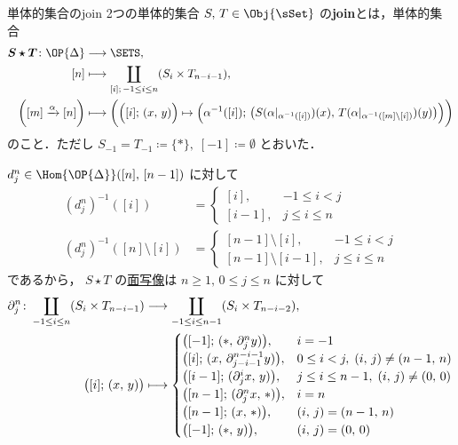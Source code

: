 \documentclass[TQFT_main]{subfiles}
\begin{document}
\begin{mydef}[label=def:Simp-Join]{単体的集合のjoin}
    2つの単体的集合 $S,\, T \in \Obj{\sSet}$ の\textbf{join}とは，単体的集合
    \begin{align}
        \bm{S \star T} \colon \OP{\Delta} &\lto \SETS, \\
        [n] &\lmto \coprod_{[i];\, -1 \le i \le n} (S_i \times T_{n-i-1}), \\
        \biggl( [m] \xrightarrow{\alpha} [n] \biggr) &\lmto \biggl( \Bigl( [i];\, (x,\, y) \Bigr) \mapsto \Bigl( \alpha^{-1}([i]);\, \bigl(S(\alpha|_{\alpha^{-1}([i])})(x),\, T(\alpha|_{\alpha^{-1}([m]\setminus[i])})(y) \bigr)  \Bigr)  \biggr) 
    \end{align}
    のこと．ただし $S_{-1} = T_{-1} \coloneqq \{*\},\; [-1] \coloneqq \emptyset$ とおいた．
\end{mydef}
$d^n_j \in \Hom{\OP{\Delta}}([n],\, [n-1])$ に対して
\begin{align}
    (d^n_j)^{-1} ([i]) &= 
    \begin{cases}
        [i], &-1 \le i < j \\
        [i-1], &j \le i \le n
    \end{cases} 
    \\
    (d^n_j)^{-1} ([n]\setminus [i]) &= \begin{cases}
        [n-1]\setminus [i], &-1 \le i < j \\
        [n-1]\setminus [i-1], &j \le i \le n
    \end{cases}
\end{align}
であるから，
$S \star T$ の\hyperref[def:SimpSet]{面写像}は $n \ge 1,\, 0 \le j \le n$ に対して
\begin{align}
    \label{eq:face-join}
    \partial^n_j \colon \coprod_{-1 \le i \le n} (S_i \times T_{n-i-1}) &\longrightarrow \coprod_{-1 \le i \le n-1} (S_i \times T_{n-i-2}), \\
    \bigl([i];\, (x,\, y) \bigr) &\longmapsto 
    \begin{cases}
        \bigl([-1];\, (*,\, \partial^n_j y) \bigr), &i=-1 \\
        \bigl([i];\, (x,\, \partial^{n-i-1}_{j-i-1} y) \bigr), &0 \le i < j,\; (i,\, j) \neq (n-1,\, n) \\
        \bigl([i-1];\, (\partial^i_j x,\, y) \bigr), &j \le i \le n-1,\; (i,\, j) \neq (0,\, 0) \\
        \bigl([n-1];\, (\partial^n_j x,\, *) \bigr), &i=n \\
        \bigl([n-1];\, (x,\, *) \bigr), &(i,\, j) = (n-1,\, n) \\
        \bigl([-1];\, (*,\, y) \bigr), &(i,\, j) = (0,\, 0)
    \end{cases}
\end{align}
\end{document}
